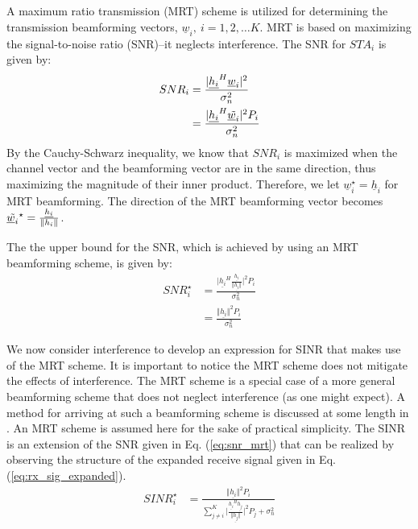 A maximum ratio transmission (MRT) scheme is utilized for determining the transmission beamforming vectors, $\underline w_i,\ i = 1,2,\ldots K$. MRT is based on maximizing the signal-to-noise ratio (SNR)--it neglects interference. The SNR for $STA_i$ is given by:
\begin{equation}
     \begin{aligned}\label{eq:snr}
        SNR_i &= \frac{\vert \underline{h_i}^H \underline w_i \vert^2}{\sigma_n^2}\\
        &= \frac{\vert \underline{h_i}^H \Tilde{\underline w_i} \vert ^2 P_i}{\sigma_n^2}
     \end{aligned}
 \end{equation}
 By the Cauchy-Schwarz inequality, we know that $SNR_i$ is maximized when the channel vector and the beamforming vector are in the same direction, thus maximizing the magnitude of their inner product. Therefore, we let $\underline w_i^{\star} = \underline h_i$ for MRT beamforming. The direction of the MRT beamforming vector becomes $\Tilde{\underline w_i}^{\star} = \frac{\underline{h_i}}{\Vert h_i \Vert}$.
 
 The the upper bound for the SNR, which is achieved by using an MRT beamforming scheme, is given by:
 \begin{equation}
     \begin{aligned}\label{eq:snr_mrt}
            SNR_i^{\star} &= \frac{\vert \underline{h_i}^H \frac{\underline{h_i}} {\Vert \underline{h_i} \Vert} \vert ^2 P_i}{\sigma_n^2}\\
            &= \frac{\Vert \underline{h_i}\Vert^2 P_i}{\sigma_n^2}
     \end{aligned}
 \end{equation}
 
 We now consider interference to develop an expression for SINR that makes use of the MRT scheme. It is important to notice the MRT scheme does not mitigate the effects of interference. The MRT scheme is a special case of a more general beamforming scheme that does not neglect interference (as one might expect). A method for arriving at such a beamforming scheme is discussed at some length in \cite{Bjornson2014}. An MRT scheme is assumed here for the sake of practical simplicity. The SINR is an extension of the SNR given in Eq. (\ref{eq:snr_mrt}) that can be realized by observing the structure of the expanded receive signal given in Eq. (\ref{eq:rx_sig_expanded}).
  \begin{equation}
     \begin{aligned}\label{eq:sinr_mrt}
            SINR_i^{\star} &=  \frac{\Vert \underline{h_i}\Vert^2 P_i}{\sum_{j \neq i}^K \vert \frac{\underline{h_i}^H\underline{h_j}}{\Vert \underline{h_j}\Vert}\vert^2 P_j + \sigma_n^2}
     \end{aligned}
 \end{equation}
 
